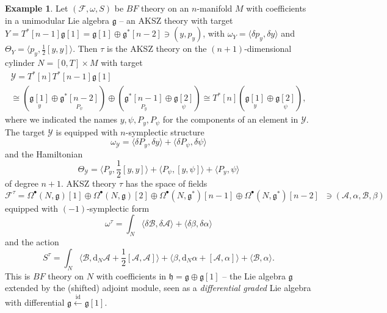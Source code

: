 \documentclass{amsart}
\theoremstyle{plain} %
\theoremstyle{definition}
\newtheorem{expl}[thm]{Example}
\theoremstyle{remark}
\newcommand{\g}{\mathfrak{g}}
\newcommand{\mc}{\mathcal}
\newcommand{\mr}{\mathrm}
\newcommand{\bt}{\bullet}
\newcommand{\F}{\mathcal{F}}
\newcommand{\A}{\mathcal{A}}
\newcommand{\B}{\mathcal{B}}
\newcommand{\dr}{\mathrm{d}}
\begin{document}
\begin{expl}\label{example: theory tau for BF}
    Let $(\F,\omega,S)$ be $BF$ theory on an $n$-manifold $M$ with coefficients in a unimodular Lie algebra $\g$ -- an AKSZ theory with target $Y=T^*[n-1]\g[1]= \g[1]\oplus \g^*[n-2] \ni (y,p_y)$, with $\omega_Y=\langle \delta p_y, \delta y\rangle$ and $\Theta_Y=\langle p_y,\frac12[y,y]\rangle$. Then $\tau$ is the AKSZ theory on the $(n+1)$-dimensional cylinder $N=[0,T]\times M$ with target
    \begin{multline}
        \mc{Y}=T^*[n] T^*[n-1] \g[1] \\
        \cong (\underset{y}{\g[1]}\oplus \underset{P_\psi}{\g^*[n-2]})\oplus (\underset{P_y}{\g^*[n-1]}\oplus \underset{\psi}{\g[2]}) \cong T^*[n] (\underset{y}{\g[1]}\oplus \underset{\psi}{\g[2]}),
    \end{multline}
    where we indicated the names $y,\psi,P_y,P_\psi$ for the components of an element in $\mc{Y}$. The target $\mc{Y}$ is equipped with $n$-symplectic structure 
    \begin{equation}
        \omega_\mc{Y}=\langle \delta P_y, \delta y \rangle + \langle \delta P_\psi,\delta\psi \rangle
    \end{equation}
    and the Hamiltonian
    \begin{equation}
        \Theta_\mc{Y}=\langle P_y,\frac12[y,y]\rangle + \langle P_\psi,[y,\psi]\rangle +\langle P_y,\psi \rangle
    \end{equation}
    of degree $n+1$. AKSZ theory $\tau$ has the space of fields
\begin{equation}
    \F^\tau=\Omega^\bt(N,\g)[1] \oplus \Omega^\bt(N,\g)[2]\oplus \Omega^\bt(N,\g^*)[n-1] \oplus \Omega^\bt(N,\g^*)[n-2] \;\; \ni(\A,\alpha,\B,\beta)
\end{equation}
equipped with $(-1)$-symplectic form 
\begin{equation}
    \omega^\tau=\int_N \langle \delta\B,\delta\A \rangle + \langle \delta \beta,\delta \alpha\rangle
\end{equation}
and the action
\begin{equation}
    S^\tau=\int_N \langle \B, \dr_N \A+\frac12[\A,\A] \rangle + \langle \beta,\dr_N\alpha+[\A,\alpha]\rangle + \langle \B,\alpha \rangle.
\end{equation}
This is $BF$ theory on $N$ with coefficients in $\mathfrak{h}=\g\oplus \g[1]$ -- the Lie algebra $\g$ extended by the (shifted) adjoint module, seen as a \emph{differential graded} Lie algebra with differential $\g \xleftarrow{\mr{id}} \g[1]$.
\end{expl}
\end{document}

